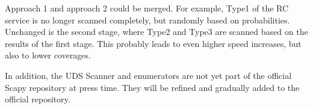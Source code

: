 Approach 1 and approach 2 could be merged. For example, Type1 of the RC service is no longer scanned completely, but randomly based on probabilities. Unchanged is the second stage, where Type2 and Type3 are scanned based on the results of the first stage. This probably leads to even higher speed increases, but also to lower coverages.

In addition, the UDS Scanner and enumerators are not yet part of the official Scapy repository at press time. They will be refined and gradually added to the official repository.
